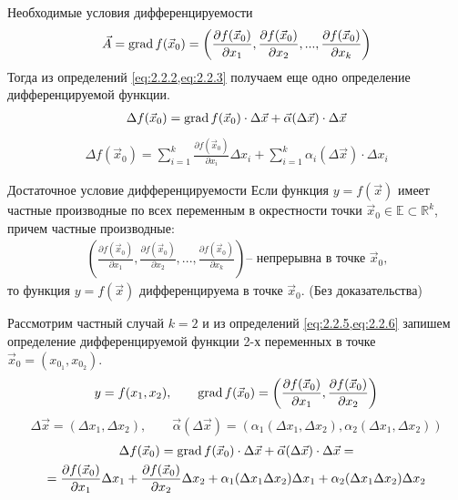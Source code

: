 \begin{tbox}{Необходимые условия дифференцируемости}
	\begin{align*}
		\vec{A} = \operatorname{grad} f(\vec{x}_0) = \left(\frac{\partial f(\vec{x}_0)}{\partial x_1}, \frac{\partial f(\vec{x}_0)}{\partial x_2}, ..., \frac{\partial f(\vec{x}_0)}{\partial x_k}\right)
	\end{align*}
	Тогда из определений \cref{eq:2.2.2,eq:2.2.3} получаем еще одно определение дифференцируемой функции.
	\begin{align}
		\Delta f(\vec{x}_0) = \operatorname{grad} f(\vec{x}_0) \cdot \Delta \vec{x} + \vec{\alpha} (\Delta \vec{x}) \cdot \Delta \vec{x}
		\label{eq:2.2.5}
	\end{align}
	\vspace{-2em}
	\begin{align}
		\Delta f(\vec{x}_0) = \sum_{i=1}^{k} \frac{\partial f(\vec{x}_0)}{\partial x_i} \Delta x_i + \sum_{i=1}^{k} \alpha_i (\Delta \vec{x}) \cdot \Delta x_i
		\label{eq:2.2.6}
	\end{align}
\end{tbox}

\begin{tbox}{Достаточное условие дифференцируемости}
	Если функция $y = f(\vec{x})$ имеет частные производные по всех переменным в окрестности точки $\vec{x}_0 \in \mathbb{E} \subset \mathbb{R}^k$, причем частные производные:
	\begin{align*}
		\left(\frac{\partial f(\vec{x}_0)}{\partial x_1}, \frac{\partial f(\vec{x}_0)}{\partial x_2}, ..., \frac{\partial f(\vec{x}_0)}{\partial x_k}\right) \text{-- непрерывна в точке $\vec{x}_0$,}
	\end{align*}
	то функция $y = f(\vec{x})$ дифференцируема в точке $\vec{x}_0$. (Без доказательства)
\end{tbox}

Рассмотрим частный случай $k = 2$ и из определений \cref{eq:2.2.5,eq:2.2.6} запишем определение дифференцируемой функции 2-х переменных в точке $\vec{x}_0 = (x_{\text{$0_1$}}, x_{\text{$0_2$}})$.
\[y = f(x_1, x_2), \qquad \operatorname{grad} f(\vec{x}_0) = \left(\frac{\partial f(\vec{x}_0)}{\partial x_1}, \frac{\partial f(\vec{x}_0)}{\partial x_2}\right)\]
\[\Delta \vec{x} = (\Delta x_1, \Delta x_2), \qquad \vec{\alpha}(\Delta \vec{x}) = \left(\alpha_1(\Delta x_1, \Delta x_2), \alpha_2(\Delta x_1, \Delta x_2)\right)\]
\begin{multline*}
	\Delta f(\vec{x}_0) = \operatorname{grad} f(\vec{x}_0) \cdot \Delta \vec{x} + \vec{\alpha}(\Delta \vec{x}) \cdot \Delta \vec{x} =\\= \frac{\partial f(\vec{x}_0)}{\partial x_1} \Delta x_1 + \frac{\partial f(\vec{x}_0)}{\partial x_2} \Delta x_2 + \alpha_1(\Delta x_1 \Delta x_2) \Delta x_1 + \alpha_2 (\Delta x_1 \Delta x_2) \Delta x_2
\end{multline*}

